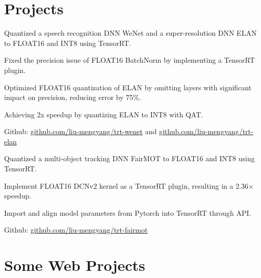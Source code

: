 \documentclass[]{deedy-resume-openfont}
\begin{document}
\begin{minipage}[t]{0.77\textwidth}
\section{Projects}
\begin{tightemize}
    \item Quantized a speech recognition DNN WeNet and a super-resolution DNN ELAN to FLOAT16 and INT8 using TensorRT.
    \item Fixed the precision issue of FLOAT16 BatchNorm by implementing a TensorRT plugin.
    \item Optimized FLOAT16 quantization of ELAN by omitting layers with significant impact on precision, reducing error by 75\%.
    \item Achieving 2x speedup by quantizing ELAN to INT8 with QAT.
    \item Github: \href{https://github.com/liu-mengyang/trt-wenet}{github.com/liu-mengyang/trt-wenet} and \href{https://github.com/liu-mengyang/trt-elan}{github.com/liu-mengyang/trt-elan}
\end{tightemize}
\sectionsep

\begin{tightemize}
    \item Quantized a multi-object tracking DNN FairMOT to FLOAT16 and INT8 using TensorRT.
    \item Implement FLOAT16 DCNv2 kernel as a TensorRT plugin, resulting in a 2.36$\times$ speedup.
    \item Import and align model parameters from Pytorch into TensorRT through API.
    \item Github: \href{https://github.com/liu-mengyang/trt-fairmot}{github.com/liu-mengyang/trt-fairmot}
\end{tightemize}
\sectionsep

\section{Some Web Projects} 


\end{minipage}
\end{document}
